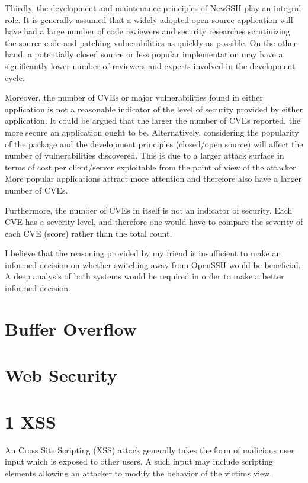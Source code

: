 \documentclass[a4paper, 12pt]{article}
\begin{document}
Thirdly, the development and maintenance principles of NewSSH play an integral role. It is generally assumed that a widely adopted open source application will have had a large number of code reviewers and security researches scrutinizing the source code and patching vulnerabilities as quickly as possible. On the other hand, a potentially closed source or less popular implementation may have a significantly lower number of reviewers and experts involved in the development cycle.

Moreover, the number of CVEs or major vulnerabilities found in either application is not a reasonable indicator of the level of security provided by either application. It could be argued that the larger the number of CVEs reported, the more secure an application ought to be. Alternatively, considering the popularity of the package and the development principles (closed/open source) will affect the number of vulnerabilities discovered. This is due to a larger attack surface in terms of cost per client/server exploitable from the point of view of the attacker. More popular applications attract more attention and therefore also have a larger number of CVEs.

Furthermore, the number of CVEs in itself is not an indicator of security. Each CVE has a severity level, and therefore one would have to compare the severity of each CVE (score) rather than the total count.

I believe that the reasoning provided by my friend is insufficient to make an informed decision on whether switching away from OpenSSH would be beneficial. A deep analysis of both systems would be required in order to make a better informed decision.

\newpage
\section*{Buffer Overflow}
\setcounter{section}{1}

\newpage
\section*{Web Security}
\setcounter{section}{1}

\section*{1 XSS}
An Cross Site Scripting (XSS) attack generally takes the form of malicious user input which is exposed to other users. A such input may include scripting elements allowing an attacker to modify the behavior of the victims view. 
\end{document}
